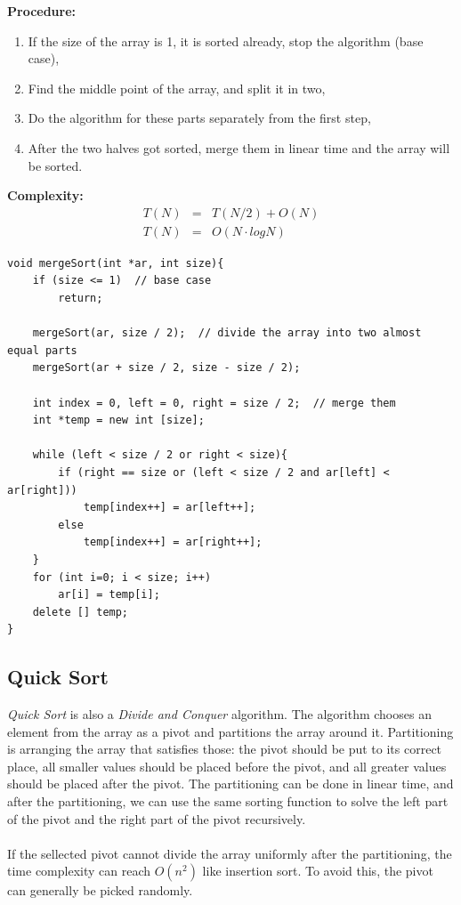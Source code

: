 \documentclass[12pt]{article}
\begin{document}
\textbf{Procedure: }
\begin{enumerate}
	\item If the size of the array is 1, it is sorted already, stop the algorithm (base case),
	\item Find the middle point of the array, and split it in two,
	\item Do the algorithm for these parts separately from the first step,
	\item After the two halves got sorted, merge them in linear time and the array will be sorted. 
\end{enumerate}	

\textbf{Complexity: }
\begin{eqnarray*}
	T(N) &=& T(N / 2) + O(N) \\
	T(N) &=& O(N \cdot logN)
\end{eqnarray*}

\begin{verbatim}
void mergeSort(int *ar, int size){
    if (size <= 1)  // base case
        return;
	
    mergeSort(ar, size / 2);  // divide the array into two almost equal parts
    mergeSort(ar + size / 2, size - size / 2);
	
    int index = 0, left = 0, right = size / 2;  // merge them 
    int *temp = new int [size];
	
    while (left < size / 2 or right < size){
        if (right == size or (left < size / 2 and ar[left] < ar[right]))
            temp[index++] = ar[left++];
        else 
            temp[index++] = ar[right++];
    }
    for (int i=0; i < size; i++)
        ar[i] = temp[i];
    delete [] temp;
}		
\end{verbatim}

\cleardoublepage
    \subsection{Quick Sort}
		
\textit{Quick Sort} is also a \textit{Divide and Conquer} algorithm. The algorithm chooses an element from the array as a pivot and partitions the array around it. Partitioning is arranging the array that satisfies those: the pivot should be put to its correct place, all smaller values should be placed before the pivot, and all greater values should be placed after the pivot. The partitioning can be done in linear time, and after the partitioning, we can use the same sorting function to solve the left part of the pivot and the right part of the pivot recursively. \\ \\
If the sellected pivot cannot divide the array uniformly after the partitioning, the time complexity can reach $O(n ^ 2)$ like insertion sort. To avoid this, the pivot can generally be picked randomly.
\end{document}
